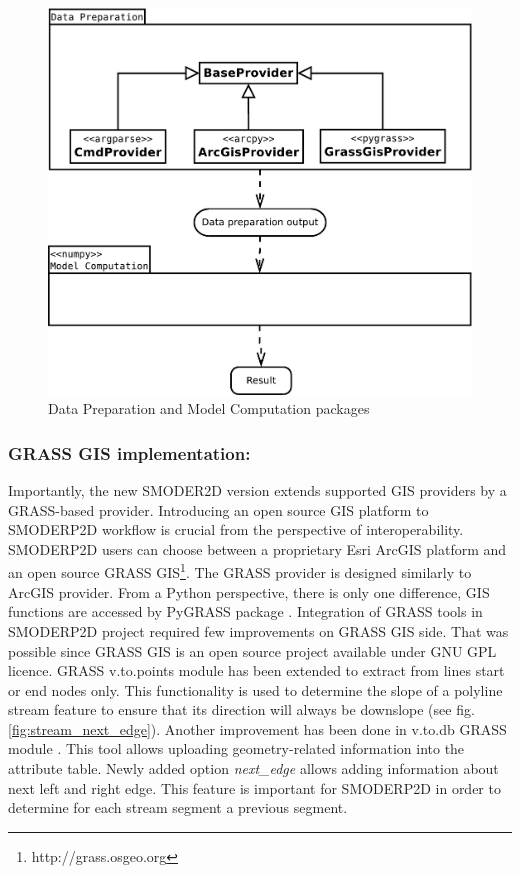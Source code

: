 \begin{figure}[ht!]
  \begin{center}
    \includegraphics[width=1.0\columnwidth]{figures/uml_diagram.pdf}
    \caption{Data Preparation and Model Computation packages}
    \label{fig:uml_diagram}
  \end{center}
\end{figure}

\subsubsection{GRASS GIS implementation:}\label{sec:grass_provider}
Importantly, the new SMODER2D version extends supported GIS providers
by a GRASS-based provider. Introducing an open source GIS platform to
SMODERP2D workflow is crucial from the perspective of
interoperability. SMODERP2D users can choose between a proprietary
Esri ArcGIS platform and an open source GRASS
GIS\footnote{http://grass.osgeo.org}. The GRASS provider is designed
similarly to ArcGIS provider. From a Python perspective, there is only
one difference, GIS functions are accessed by PyGRASS package
\cite{ijgi2010201}. Integration of GRASS tools in SMODERP2D project
required few improvements on GRASS GIS side. That was possible since
GRASS GIS is an open source project available under GNU GPL
licence. GRASS v.to.points module \cite{v-to-points-2019} has been
extended to extract from lines start or end nodes only. This
functionality is used to determine the slope of a polyline stream
feature to ensure that its direction will always be downslope (see
fig. \ref{fig:stream_next_edge}). Another improvement has been done in
v.to.db GRASS module \cite{v-to-db-2019}. This tool allows uploading
geometry-related information into the attribute table. Newly added
option {\it next\_edge} allows adding information about next left and
right edge. This feature is important for SMODERP2D in order to
determine for each stream segment a previous segment.

